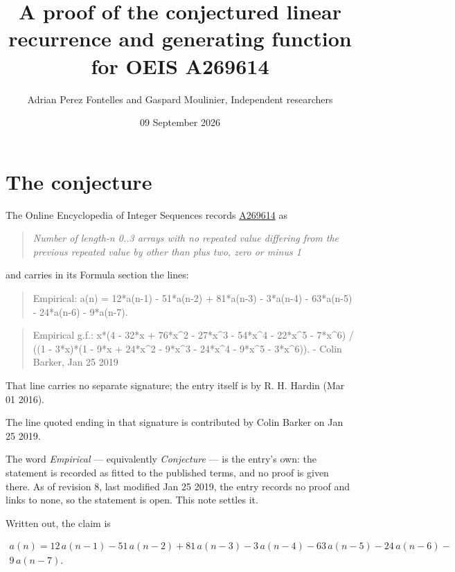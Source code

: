 \documentclass[11pt]{article}
\title{A proof of the conjectured linear recurrence and generating function for OEIS A269614}
\author{Adrian Perez Fontelles and Gaspard Moulinier, Independent researchers}
\date{09 September 2026}
\theoremstyle{definition}
\begin{document}
\maketitle
\section{The conjecture}

The Online Encyclopedia of Integer Sequences records \href{https://oeis.org/A269614}{A269614} as

\begin{quote}\itshape Number of length-n 0..3 arrays with no repeated value differing from the previous repeated value by other than plus two, zero or minus 1\end{quote}

and carries in its Formula section the lines:

\begin{quote}\ttfamily Empirical: a(n) = 12*a(n-1) - 51*a(n-2) + 81*a(n-3) - 3*a(n-4) - 63*a(n-5) - 24*a(n-6) - 9*a(n-7).\end{quote}

\begin{quote}\ttfamily Empirical g.f.: x*(4 - 32*x + 76*x\textasciicircum{}2 - 27*x\textasciicircum{}3 - 54*x\textasciicircum{}4 - 22*x\textasciicircum{}5 - 7*x\textasciicircum{}6) / ((1 - 3*x)*(1 - 9*x + 24*x\textasciicircum{}2 - 9*x\textasciicircum{}3 - 24*x\textasciicircum{}4 - 9*x\textasciicircum{}5 - 3*x\textasciicircum{}6)). - Colin Barker, Jan 25 2019\end{quote}

That line carries no separate signature; the entry itself is by R. H. Hardin (Mar 01 2016).

The line quoted ending in that signature is contributed by Colin Barker on Jan 25 2019.

The word {\itshape Empirical} --- equivalently {\itshape Conjecture} --- is the entry's own: the statement is recorded as fitted to the published terms, and no proof is given there. As of revision 8, last modified Jan 25 2019, the entry records no proof and links to none, so the statement is open. This note settles it.

Written out, the claim is

\begin{multline*} a(n) = 12\,a(n-1) - 51\,a(n-2) + 81\,a(n-3) - 3\,a(n-4) - 63\,a(n-5) - 24\,a(n-6) - \\ 9\,a(n-7). \end{multline*}
\end{document}
